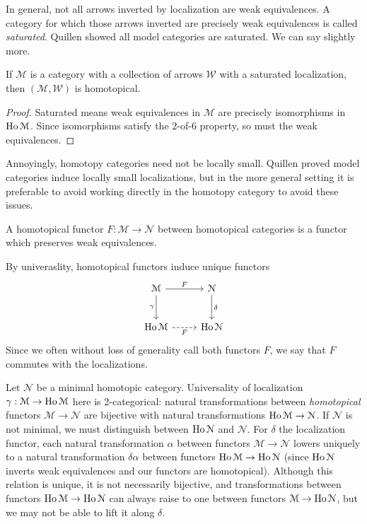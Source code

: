 \begin{remark}
	In general, not all arrows inverted by localization are weak equivalences. A category for which those arrows inverted are precisely weak equivalences is called \emph{saturated}. Quillen showed all model categories are saturated. We can say slightly more.
\end{remark}
\begin{lemma}\label{lma:2.1}
	If $\mathcal{M} $ is a category with a collection of arrows $\mathcal{W} $ with a saturated localization, then $(\mathcal{M} ,\mathcal{W} )$ is homotopical.
\end{lemma}
\begin{proof}
	Saturated means weak equivalences in $\mathcal{M} $ are precisely isomorphisms in $\operatorname{Ho} \mathcal{M} $. Since isomorphisms satisfy the 2-of-6 property, so must the weak equivalences.
\end{proof}

Annoyingly, homotopy categories need not be locally small. Quillen proved model categories induce locally small localizations, but in the more general setting it is preferable to avoid working directly in the homotopy category to avoid these issues.

\begin{definition}\label{dfn:2.3}
	A homotopical functor $F : \mathcal{M}  \to \mathcal{N} $ between homotopical categories is a functor which preserves weak equivalences.
\end{definition}

By univeraslity, homotopical functors induce unique functors
\[\begin{tikzcd}[row sep = 2.5em, column sep = 2.5em]
\mathcal{M} \ar[" F ", r] \ar[" \gamma "', d]  & \mathcal{N} \ar[" \delta ", d]  \\
\Ho \mathcal{M} \ar[" F "', dashed, r]  & \Ho \mathcal{N} 
\end{tikzcd}\]
Since we often without loss of generality call both functors $F$, we say that $F$ commutes with the localizations.

\begin{remark}
	Let $\mathcal{N} $ be a minimal homotopic category. Universality of localization $\gamma : \mathcal{M}  \to \operatorname{Ho} \mathcal{M} $ here is 2-categorical: natural transformations between \emph{homotopical} functors $\mathcal{M} \to \mathcal{N} $ are bijective with natural transformations $\operatorname{Ho} \mathcal{M} \to \mathcal{N} $. If $\mathcal{N} $ is not minimal, we must distinguish between $\operatorname{Ho} \mathcal{N} $ and $\mathcal{N} $. For $\delta$ the localization functor, each natural transformation $\alpha$ between functors $\mathcal{M} \to \mathcal{N} $ lowers uniquely to a natural transformation $\delta\alpha$ between functors $\operatorname{Ho}\mathcal{M} \to \operatorname{Ho} \mathcal{N} $ (since $\operatorname{Ho} \mathcal{N} $ inverts weak equivalences and our functors are homotopical). Although this relation is unique, it is not necessarily bijective, and transformations between functors $\operatorname{Ho} \mathcal{M} \to \operatorname{Ho} \mathcal{N} $ can always raise to one between functors $\mathcal{M} \to \operatorname{Ho} \mathcal{N} $, but we may not be able to lift it along $\delta.$
\end{remark}

